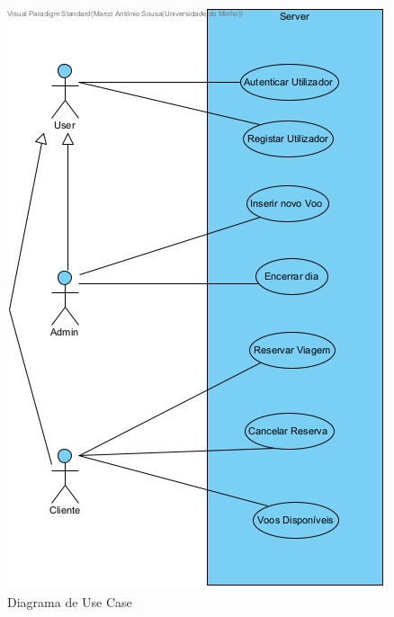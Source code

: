 \documentclass[a4paper,11pt]{scrreprt}
\begin{document}
\printnomenclature



\begin{figure}[!ht]
    \centering
    \includegraphics[scale=0.75]{diagramas/useCaseDiagram.jpg}
    \caption{Diagrama de Use Case} \label{img:use_case}
\end{figure}
\end{document}

